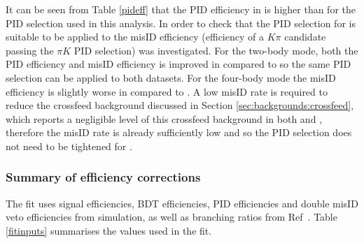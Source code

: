 It can be seen from Table \ref{pideff} that the PID efficiency in \runtwo is higher than \runone for the PID selection used in this analysis. In order to check that the PID selection for \runone is suitable to be applied to \runtwo the misID efficiency (efficiency of a $K\pi$ candidate passing the $\pi K$ PID selection) was investigated. For the two-body mode, both the PID efficiency and misID efficiency is improved in \runtwo compared to \runone so the same PID selection can be applied to both datasets. For the four-body mode the misID efficiency is slightly worse in \runtwo compared to \runone. A low misID rate is required to reduce the crossfeed background discussed in Section \ref{sec:backgrounds:crossfeed}, which reports a negligible level of this crossfeed background in both \runone and \runtwo, therefore the misID rate is already sufficiently low and so the PID selection does not need to be tightened for \runtwo.

\subsubsection{Summary of efficiency corrections}
\label{sec:cpfit:efficiencies:summary}

The \CP fit uses signal efficiencies, BDT efficiencies, PID efficiencies and double misID veto efficiencies from simulation, as well as branching ratios from Ref~\cite{PDG2016}. Table \ref{fitinputs} summarises the values used in the \CP fit. 

